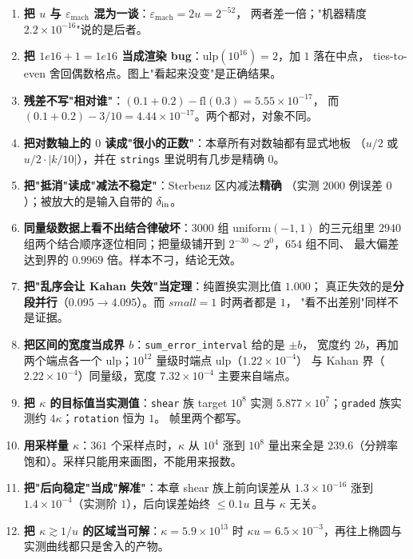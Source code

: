 \begin{enumerate}
  \item \textbf{把 $u$ 与 $\varepsilon_{\text{mach}}$ 混为一谈}：$\varepsilon_{\text{mach}}=2u=2^{-52}$，
        两者差一倍；"机器精度 $2.2\times10^{-16}$"说的是后者。
  \item \textbf{把 $1e16+1=1e16$ 当成渲染 bug}：$\mathrm{ulp}(10^{16})=2$，加 $1$ 落在中点，
        ties-to-even 舍回偶数格点。图上"看起来没变"是正确结果。
  \item \textbf{残差不写"相对谁"}：$(0.1+0.2)-\mathrm{fl}(0.3)=5.55\times10^{-17}$，
        而 $(0.1+0.2)-3/10=4.44\times10^{-17}$。两个都对，对象不同。
  \item \textbf{把对数轴上的 $0$ 读成"很小的正数"}：本章所有对数轴都有显式地板
        （$u/2$ 或 $u/2\cdot|k/10|$），并在 \texttt{strings} 里说明有几步是精确 $0$。
  \item \textbf{把"抵消"读成"减法不稳定"}：Sterbenz 区内减法\textbf{精确}
        （实测 $2000$ 例误差 $0$）；被放大的是输入自带的 $\delta_{\rm in}$。
  \item \textbf{同量级数据上看不出结合律破坏}：$3000$ 组 $\mathrm{uniform}(-1,1)$ 的三元组里
        $2940$ 组两个结合顺序逐位相同；把量级铺开到 $2^{-30}\sim2^{0}$，$654$ 组不同、
        最大偏差达到界的 $0.9969$ 倍。样本不刁，结论无效。
  \item \textbf{把"乱序会让 Kahan 失效"当定理}：纯置换实测比值 $1.000$；
        真正失效的是\textbf{分段并行}（$0.095\to4.095$）。而 $small=1$ 时两者都是 $1$，
        "看不出差别"同样不是证据。
  \item \textbf{把区间的宽度当成界 $b$}：\texttt{sum\_error\_interval} 给的是 $\pm b$，
        宽度约 $2b$，再加两个端点各一个 ulp；$10^{12}$ 量级时端点 ulp（$1.22\times10^{-4}$）
        与 Kahan 界（$2.22\times10^{-4}$）同量级，宽度 $7.32\times10^{-4}$ 主要来自端点。
  \item \textbf{把 $\kappa$ 的目标值当实测值}：\texttt{shear} 族 target $10^8$ 实测
        $5.877\times10^7$；\texttt{graded} 族实测约 $4\kappa$；\texttt{rotation} 恒为 $1$。
        帧里两个都写。
  \item \textbf{用采样量 $\kappa$}：$361$ 个采样点时，$\kappa$ 从 $10^4$ 涨到 $10^8$
        量出来全是 $239.6$（分辨率饱和）。采样只能用来画图，不能用来报数。
  \item \textbf{把"后向稳定"当成"解准"}：本章 shear 族上前向误差从 $1.3\times10^{-16}$
        涨到 $1.4\times10^{-4}$（实测阶 $1$），后向误差始终 $\le0.1u$ 且与 $\kappa$ 无关。
  \item \textbf{把 $\kappa\gtrsim1/u$ 的区域当可解}：$\kappa=5.9\times10^{13}$ 时
        $\kappa u=6.5\times10^{-3}$，再往上椭圆与实测曲线都只是舍入的产物。
\end{enumerate}
